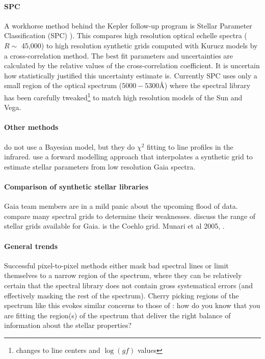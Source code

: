 \documentclass[preprint]{aastex} %
\begin{document}
\paragraph{SPC} A workhorse method behind the Kepler follow-up program is Stellar Parameter Classification (SPC) \citep{blj+12}). This compares high resolution optical echelle spectra ($R \sim$ 45,000) to high resolution synthetic grids computed with Kurucz models by a cross-correlation method. The best fit parameters and uncertainties are calculated by the relative values of the cross-correlation coefficient. It is uncertain how statistically justified this uncertainty estimate is. Currently SPC uses only a small region of the optical spectrum ($5000 - 5300$\AA) where the spectral library has been carefully tweaked\footnote{changes to line centers and $\log(gf)$ values} to match high resolution models of the Sun and Vega. 

\paragraph{Other methods} \citet{dj03} do not use a Bayesian model, but they do $\chi^2$ fitting to line profiles in the infrared. \citet{bai10} use a forward modelling approach that interpolates a synthetic grid to estimate stellar parameters from low resolution Gaia spectra.

\paragraph{Comparison of synthetic stellar libraries}
Gaia team members are in a mild panic about the upcoming flood of data. \citet{mc07} compare many spectral grids to determine their weaknesses. \citep{svt+11} discuss the range of stellar grids available for Gaia. \citep{cbm+05} is the Coehlo grid. Munari et al 2005, \citep{hwd+13}.

\paragraph{General trends}
Successful pixel-to-pixel methods either mask bad spectral lines or limit themselves to a narrow region of the spectrum, where they can be relatively certain that the spectral library does not contain gross systematical errors (and effectively masking the rest of the spectrum). Cherry picking regions of the spectrum like this evokes similar concerns to those of \citet{mga13}: how do you know that you are fitting the region(s) of the spectrum that deliver the right balance of information about the stellar properties?
\end{document}
